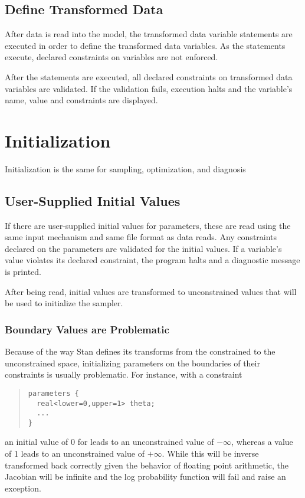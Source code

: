 \subsection{Define Transformed Data}

After data is read into the model, the transformed data variable
statements are executed in order to define the transformed data
variables.  As the statements execute, declared constraints on
variables are not enforced.

After the statements are executed, all declared constraints on
transformed data variables are validated.  If the validation fails,
execution halts and the variable's name, value and constraints are
displayed.

\section{Initialization}

Initialization is the same for sampling, optimization, and diagnosis

\subsection{User-Supplied Initial Values}

If there are user-supplied initial values for parameters, these are
read using the same input mechanism and same file format as data
reads.  Any constraints declared on the parameters are validated for
the initial values.  If a variable's value violates its declared
constraint, the program halts and a diagnostic message is printed.

After being read, initial values are transformed to unconstrained
values that will be used to initialize the sampler. 

\subsubsection{Boundary Values are Problematic}

Because of the way Stan defines its transforms from the constrained to
the unconstrained space, initializing parameters on the boundaries of
their constraints is usually problematic.  For instance, with a
constraint
%
\begin{quote}
\begin{Verbatim}
parameters {
  real<lower=0,upper=1> theta;
  ...
}
\end{Verbatim}
\end{quote}
%
an initial value of 0 for  leads to an unconstrained value
of $-\infty$, whereas a value of 1 leads to an unconstrained value of
$+\infty$.  While this will be inverse transformed back correctly
given the behavior of floating point arithmetic, the Jacobian will be
infinite and the log probability function will fail and raise an
exception.  

